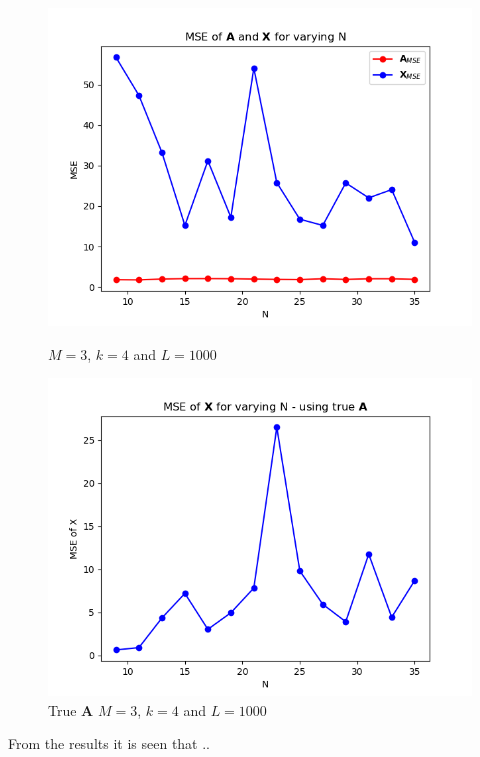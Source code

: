 \begin{figure}[H]
    \begin{minipage}[t]{.45\textwidth}
    	\centering
		\includegraphics[scale=0.5]{figures/ch_6/varyN_recA.png}
		\caption{ $M = 3$, $k=4$ and $L=1000$}
		\label{fig:varyN1}
    \end{minipage} 
    \hfill
    \begin{minipage}[t]{.45\textwidth}
        \centering
		\includegraphics[scale=0.5]{figures/ch_6/varyN_trueA.png}
		\caption{True $\textbf{A}$ $M = 3$, $k=4$ and $L=1000$ }
		\label{fig:varyN2}
    \end{minipage}
\end{figure}

From the results it is seen that .. 



